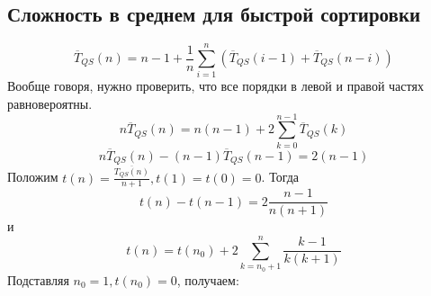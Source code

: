 \documentclass[11pt]{article}
\begin{document}
\subsection{Сложность в среднем для быстрой сортировки}
\label{sec:orgbd7b587}
   \begin{equation}
\overline{T}_{QS}(n) = n - 1 + \frac1n\sum_{i = 1}^n\left(\overline{T}_{QS}(i - 1) +
\overline{T}_{QS}(n - i)\right)
   \end{equation}
Вообще говоря, нужно проверить, что все порядки в левой и правой частях равновероятны.
\begin{equation}
n\overline{T}_{QS}(n) = n(n - 1) + 2\sum_{k = 0}^{n - 1}\overline{T}_{QS}(k)
\end{equation}
\begin{equation}
n\overline{T}_{QS}(n) - (n - 1)\overline{T}_{QS}(n - 1) = 2(n - 1)
\end{equation}
Положим $t(n) = \frac{\overline{T_{QS}(n)}}{n + 1}, t(1) = t(0) = 0$. Тогда
\begin{equation}
t(n) - t(n - 1) = 2\frac{n - 1}{n(n + 1)}
\end{equation}
и
\begin{equation}
t(n) = t(n_0) + 2\sum_{k = n_0 + 1}^n\frac{k - 1}{k(k + 1)}
\end{equation}
Подставляя $n_0 = 1, t(n_0) = 0$, получаем:
\end{document}
